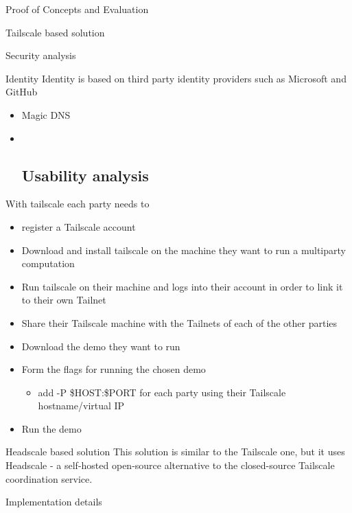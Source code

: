 \begin{frame}{Proof of Concepts and Evaluation}
\begin{block}{Tailscale based solution}
\begin{block}{Security analysis}
\begin{block}{Identity}
\protect\hypertarget{identity}{}
Identity is based on third party identity providers such as Microsoft
and GitHub

\begin{itemize}
\item
  Magic DNS
\item ~
  \hypertarget{usability-analysis}{%
  \subsection{Usability analysis}\label{usability-analysis}}
\end{itemize}

With tailscale each party needs to

\begin{itemize}
\tightlist
\item
  register a Tailscale account
\item
  Download and install tailscale on the machine they want to run a
  multiparty computation
\item
  Run tailscale on their machine and logs into their account in order to
  link it to their own Tailnet
\item
  Share their Tailscale machine with the Tailnets of each of the other
  parties
\item
  Download the demo they want to run
\item
  Form the flags for running the chosen demo

  \begin{itemize}
  \tightlist
  \item
    add -P \$HOST:\$PORT for each party using their Tailscale
    hostname/virtual IP
  \end{itemize}
\item
  Run the demo
\end{itemize}
\end{block}
\end{block}
\end{block}

\begin{block}{Headscale based solution}
\protect\hypertarget{headscale-based-solution}{}
This solution is similar to the Tailscale one, but it uses Headscale - a
self-hosted open-source alternative to the closed-source Tailscale
coordination service.

\begin{block}{Implementation details}
\protect\hypertarget{implementation-details}{}
\end{block}


\end{block}
\end{frame}
